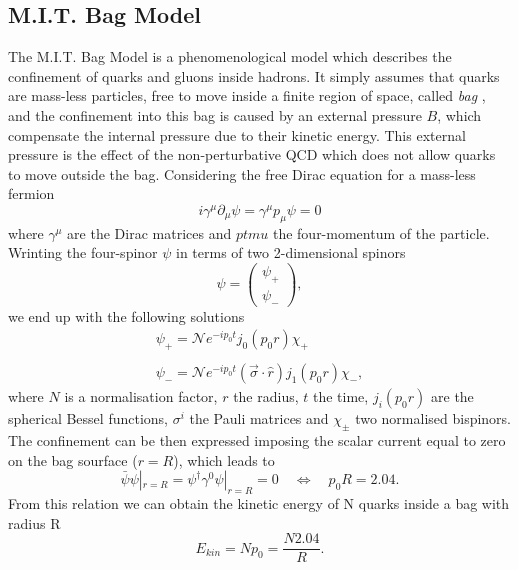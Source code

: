 \documentclass[b5paper,10pt,twoside,oldstyle,classica]{toptesi}
\begin{document}
\subsection{M.I.T. Bag Model}
The M.I.T. Bag Model \cite{Johnson:1975zp} is a phenomenological model which describes the confinement of quarks and gluons inside hadrons. It simply assumes that quarks are mass-less particles, free to move inside a finite region of space, called \textit{bag} \cite{Chodos:1974je}, and the confinement into this bag is caused by an external pressure $B$, which compensate the internal pressure due to their kinetic energy. This external pressure is the effect of the non-perturbative QCD which does not allow quarks to move outside the bag.
Considering the free Dirac equation for a mass-less fermion
\begin{equation}
 i\gamma^{\mu}\partial_{\mu}\psi = \gamma^{\mu}p_{\mu}\psi = 0
\end{equation}
where $\gamma^\mu$ are the Dirac matrices and $ ptmu$ the four-momentum of the particle.
Wrinting the four-spinor $\psi$ in terms of two 2-dimensional spinors 
\begin{equation}
 \psi = \left(
 \begin{array}{c}
  \psi_+\\
  \psi_-
 \end{array}
 \right),
\end{equation}
we end up with the following solutions
\begin{equation}
\begin{array}{c}
 \psi_+ = \mathcal{N}e^{-ip_0t}j_0(p_0r)\chi_+\\\\
 \psi_- = \mathcal{N}e^{-ip_0t}(\vec{\sigma}\cdot\hat{r})j_1(p_0r)\chi_-,
\end{array}
 \end{equation}
where $N$ is a normalisation factor, $r$ the radius, $t$ the time, $j_i(p_0r)$ are the spherical Bessel functions, $\sigma^i$ the Pauli matrices and $\chi_\pm$ two normalised bispinors.
The confinement can be then expressed imposing the scalar current equal to zero on the bag sourface ($r=R$), which leads to
\begin{equation}
 \bar{\psi}\psi|_{r=R} = \psi^{\dagger}\gamma^0\psi|_{r=R} = 0 \quad \Leftrightarrow \quad p_0R = 2.04.
\end{equation}
From this relation we can obtain the kinetic energy of N quarks inside a bag with radius R
\begin{equation}
E_{kin} = Np_0 = \frac{N2.04}{R}. 
\end{equation}
\end{document}
